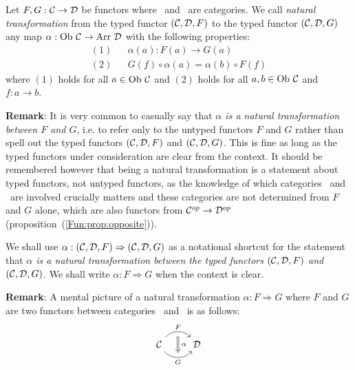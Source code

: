 \begin{defin}\label{Nat:def:natural}
    Let $F,G:\mbox{$\cal C$}\to\mbox{$\cal D$}$ be functors where \Cat\ and \Dat\ are categories.
    We call {\em natural transformation} from the typed functor $(\mbox{$\cal C$},\mbox{$\cal D$},F)$ 
    to the typed functor $(\mbox{$\cal C$},\mbox{$\cal D$},G)$ any map $\alpha : \mbox{\rm Ob}\ \mbox{$\cal C$}\to\mbox{\rm Arr}\ \mbox{$\cal D$}$ 
    with the following properties:
        \begin{eqnarray*}
            (1)& &\alpha(a) : F(a) \to G(a)\\
            (2)& &G(f)\circ\alpha(a) = \alpha(b) \circ F(f)
        \end{eqnarray*}
    where $(1)$ holds for all $a\in\mbox{\rm Ob}\ \mbox{$\cal C$}$ and $(2)$ holds for all 
    $a,b\in\mbox{\rm Ob}\ \mbox{$\cal C$}$ and $f:a\to b$.
\end{defin}

\noindent
{\bf Remark}: It is very common to casually say that {\em $\alpha$ is a natural
transformation between $F$ and $G$}, i.e. to refer only to the untyped functors
$F$ and $G$ rather than spell out the typed functors $(\mbox{$\cal C$},\mbox{$\cal D$},F)$ and
$(\mbox{$\cal C$},\mbox{$\cal D$},G)$. This is fine as long as the typed functors under consideration
are clear from the context. It should be remembered however that being a
natural transformation is a statement about typed functors, not untyped
functors, as the knowledge of which categories \Cat\ and \Dat\ are involved
crucially matters and these categories are not determined from $F$ and $G$
alone, which are also functors from $\mbox{${\cal C}^{op}$}\to\mbox{${\cal D}^{op}$}$ 
(proposition~(\ref{Fun:prop:opposite})).

\begin{notation}\label{Nat:notation:natural:arrow}
    We shall use $\alpha:(\mbox{$\cal C$},\mbox{$\cal D$},F)\Rightarrow (\mbox{$\cal C$},\mbox{$\cal D$},G)$ as a notational 
    shortcut for the statement that {\em $\alpha$ is a natural transformation 
    between the typed functors $(\mbox{$\cal C$},\mbox{$\cal D$},F)$ and $(\mbox{$\cal C$},\mbox{$\cal D$},G)$}. We shall
    write $\alpha:F\Rightarrow G$ when the context is clear.
\end{notation}

\noindent
{\bf Remark}: A mental picture of a natural transformation $\alpha:F\Rightarrow 
G$ where $F$ and $G$ are two functors between categories \Cat\ and \Dat\ is as 
follows:
    \[
        \begin{tikzcd}
            \Cat \arrow[r, "F", bend left  = 50, ""{name=U, below}]
                 \arrow[r, swap, "G", bend right = 50, ""{name=D, above}]
              & \Dat
            \arrow[Rightarrow, "\,\alpha", from = U, to = D]
        \end{tikzcd}
    \]

